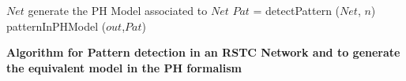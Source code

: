 
\begin{algorithm}
\begin{algorithmic}[1]
\REQUIRE $Net$ 
\ENSURE generate the PH Model associated to $Net$
\STATE $Pat$ = detectPattern ($Net$, $n$)
\STATE patternInPHModel ($out$,$Pat$)

\ENDFOR
\end{algorithmic}
\caption{\bf Algorithm for Pattern detection in an RSTC Network and to generate the equivalent model in the PH formalism}
\label{automaticGenerationOfPHModel}
\end{algorithm}



